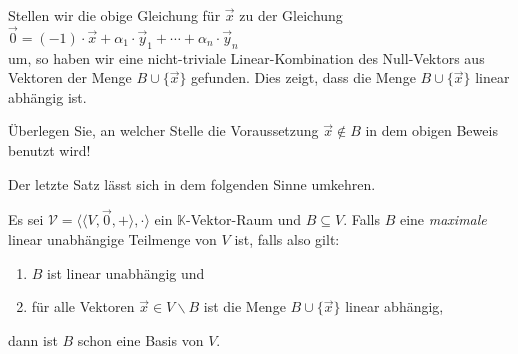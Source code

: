 Stellen wir die obige Gleichung f\"{u}r $\vec{x}$ zu der Gleichung
\\[0.2cm]
\hspace*{1.3cm}
$\vec{0} = (-1) \cdot \vec{x} + \alpha_1 \cdot \vec{y}_1 + \cdots + \alpha_n \cdot \vec{y}_n$
\\[0.2cm]
um, so haben wir eine nicht-triviale Linear-Kombination des Null-Vektors aus Vektoren der Menge 
$B \cup \{ \vec{x} \}$ gefunden.  Dies zeigt, dass die Menge $B \cup \{ \vec{x} \}$ linear abh\"{a}ngig
ist. \qeds

\exercise
\"{U}berlegen Sie, an welcher Stelle die Voraussetzung $\vec{x} \not\in B$ in dem obigen Beweis benutzt wird!
\eox

\noindent
Der letzte Satz l\"{a}sst sich in dem folgenden Sinne umkehren.

\begin{Satz}
  Es sei $\mathcal{V} = \bigl\langle \langle V, \vec{0}, + \rangle, \cdot \bigr\rangle$ ein $\mathbb{K}$-Vektor-Raum 
  und $B \subseteq V$.  Falls $B$ eine \emph{maximale} linear 
  unabh\"{a}ngige Teilmenge von $V$ ist, falls also gilt:
  \begin{enumerate}
  \item $B$ ist linear unabh\"{a}ngig und
  \item f\"{u}r alle Vektoren $\vec{x} \in V \backslash B$ ist die Menge $B \cup \{ \vec{x} \}$
        linear abh\"{a}ngig,
  \end{enumerate}
  dann ist $B$ schon eine Basis von $V$.
\end{Satz}

